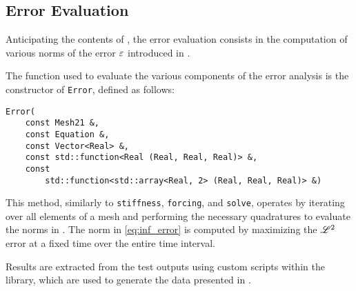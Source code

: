 \newpage
\subsection{Error Evaluation}

Anticipating the contents of , the error evaluation consists in the computation of various norms of the error $\varepsilon$ introduced in .

The function used to evaluate the various components of the error analysis is the constructor of \lstinline{Error}, defined as follows:
\begin{lstlisting}[style=cpp]
Error(
    const Mesh21 &, 
    const Equation &, 
    const Vector<Real> &, 
    const std::function<Real (Real, Real, Real)> &, 
    const 
        std::function<std::array<Real, 2> (Real, Real, Real)> &)
\end{lstlisting}

This method, similarly to \lstinline{stiffness}, \lstinline{forcing}, and \lstinline{solve}, operates by iterating over all elements of a mesh and performing the necessary quadratures to evaluate the norms in . The norm in \cref{eq:inf_error} is computed by maximizing the $\mathscr{L}^{2}$ error at a fixed time over the entire time interval.

Results are extracted from the test outputs using custom scripts within the library, which are used to generate the data presented in .